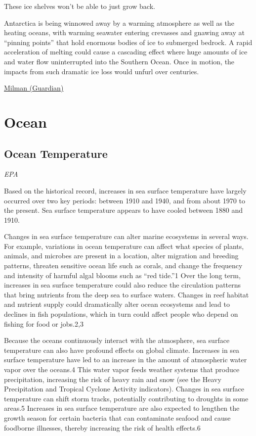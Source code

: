 \documentclass[
]{book}
\begin{document}
These ice shelves won't be able to just grow back.

Antarctica is being winnowed away by a warming atmosphere as well as the heating oceans, with warming seawater entering crevasses and gnawing away at ``pinning points'' that hold enormous bodies of ice to submerged bedrock. A rapid acceleration of melting could cause a cascading effect where huge amounts of ice and water flow uninterrupted into the Southern Ocean.
Once in motion, the impacts from such dramatic ice loss would unfurl over centuries.

\href{https://www.theguardian.com/environment/2021/may/05/antarctica-ice-sheet-melting-global-heating-sea-level-rise-study}{Milman (Guardian)}

\hypertarget{ocean}{%
\chapter{Ocean}\label{ocean}}

\hypertarget{ocean-temperature}{%
\section{Ocean Temperature}\label{ocean-temperature}}

\emph{EPA}

Based on the historical record, increases in sea surface temperature have largely occurred over two key periods: between 1910 and 1940, and from about 1970 to the present. Sea surface temperature appears to have cooled between 1880 and 1910.

Changes in sea surface temperature can alter marine ecosystems in several ways. For example, variations in ocean temperature can affect what species of plants, animals, and microbes are present in a location, alter migration and breeding patterns, threaten sensitive ocean life such as corals, and change the frequency and intensity of harmful algal blooms such as ``red tide.''1 Over the long term, increases in sea surface temperature could also reduce the circulation patterns that bring nutrients from the deep sea to surface waters. Changes in reef habitat and nutrient supply could dramatically alter ocean ecosystems and lead to declines in fish populations, which in turn could affect people who depend on fishing for food or jobs.2,3

Because the oceans continuously interact with the atmosphere, sea surface temperature can also have profound effects on global climate. Increases in sea surface temperature have led to an increase in the amount of atmospheric water vapor over the oceans.4 This water vapor feeds weather systems that produce precipitation, increasing the risk of heavy rain and snow (see the Heavy Precipitation and Tropical Cyclone Activity indicators). Changes in sea surface temperature can shift storm tracks, potentially contributing to droughts in some areas.5 Increases in sea surface temperature are also expected to lengthen the growth season for certain bacteria that can contaminate seafood and cause foodborne illnesses, thereby increasing the risk of health effects.6
\end{document}
